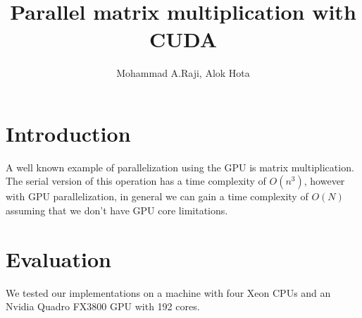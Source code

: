 \documentclass[11pt,a4paper]{article}
\author{Mohammad A.Raji, Alok Hota}
\title{Parallel matrix multiplication with CUDA}
\begin{document}
	\maketitle
	
	\section{Introduction}
A well known example of parallelization using the GPU is matrix multiplication. The serial version of this operation has a time complexity of $O(n^3)$, however with GPU parallelization, in general we can gain a time complexity of $O(N)$ assuming that we don't have GPU core limitations. 
	
	\section{Evaluation}
	We tested our implementations on a machine with four Xeon CPUs and an Nvidia Quadro FX3800 GPU with 192 cores. 
	
\end{document}
